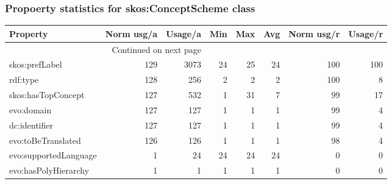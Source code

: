 \documentclass[10pt,a4paper,titlepage,final]{article}
\begin{document}
\subsubsection{Propoerty statistics for skos:ConceptScheme class}
\begin{longtable}{lrrrrrrr}
\toprule
              Property &  Norm usg/a &  Usage/a &  Min &  Max &  Avg &  Norm usg/r &  Usage/r \\
\midrule
\endhead
\midrule
\multicolumn{3}{r}{{Continued on next page}} \\
\midrule
\endfoot

\bottomrule
\endlastfoot
        skos:prefLabel &         129 &     3073 &   24 &   25 &   24 &         100 &      100 \\
              rdf:type &         128 &      256 &    2 &    2 &    2 &         100 &        8 \\
    skos:hasTopConcept &         127 &      532 &    1 &   31 &    7 &          99 &       17 \\
            evo:domain &         127 &      127 &    1 &    1 &    1 &          99 &        4 \\
         dc:identifier &         127 &      127 &    1 &    1 &    1 &          99 &        4 \\
    evo:toBeTranslated &         126 &      126 &    1 &    1 &    1 &          98 &        4 \\
 evo:supportedLanguage &           1 &       24 &   24 &   24 &   24 &           0 &        0 \\
  evo:hasPolyHierarchy &           1 &        1 &    1 &    1 &    1 &           0 &        0 \\
\end{longtable}
\end{document}
